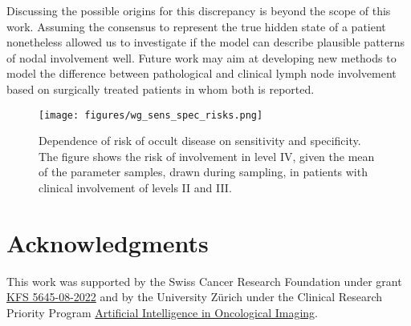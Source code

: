 \documentclass[twocolumn]{aastex631}
\begin{document}
Discussing the possible origins for this discrepancy is beyond the scope of this work. Assuming the consensus to represent the true hidden state of a patient nonetheless allowed us to investigate if the model can describe plausible patterns of nodal involvement well. Future work may aim at developing new methods to model the difference between pathological and clinical lymph node involvement based on surgically treated patients in whom both is reported.

\begin{figure}
    \begin{centering}
        \texttt{[image: figures/wg\_sens\_spec\_risks.png]}
        \caption{Dependence of risk of occult disease on sensitivity and specificity. The figure shows the risk of involvement in level IV, given the mean of the parameter samples, drawn during sampling, in patients with clinical involvement of levels II and III. \label{fig:wg_sens_spec_risks}}
    \end{centering}
\end{figure}

\section{Acknowledgments}

This work was supported by the Swiss Cancer Research Foundation under grant \href{https://www.krebsforschung.ch/unterstuetzen-sie-uns/stiftungen/-dl-/fileadmin/downloads/unterstuetzen-sie-uns/projekte-der-stiftung-krebsforschung-schweiz-2023.pdf}{KFS 5645-08-2022} and by the University Zürich under the Clinical Research Priority Program \href{https://www.crpp-ai-oncology.uzh.ch/en/Projects/Project-5.html}{Artificial Intelligence in Oncological Imaging}.


\end{document}
